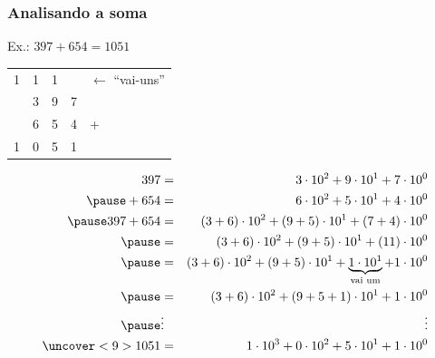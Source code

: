 \documentclass{beamer}
\begin{document}
\begin{frame}
\frametitle{Analisando a soma}

Ex.: $397 + 654 = 1051$\\[4pt]

\begin{center}
\begin{tabular}{c@{\,}c@{\,}c@{\,}cl}
 1 & 1 & 1 &   & $\leftarrow$ ``vai-uns''\\
   & 3 & 9 & 7 &   \\
   & 6 & 5 & 4 & + \\
\cline{1-4}
 1 & 0 & 5 & 1
\end{tabular}
\end{center}\vspace{-8pt}
\pause
\begin{eqnarray*}
397 & = & 3\cdot10^2 + 9\cdot10^1 + 7\cdot10^0\\
\pause
+ 654 & = & 6\cdot10^2 + 5\cdot10^1 + 4\cdot10^0\\
\pause
397 + 654 & = & (3+6)\cdot10^2 + (9+5)\cdot10^1 + (7+4)\cdot10^0 \\
\pause
          & = & (3+6)\cdot10^2 + (9+5)\cdot10^1 + (11)\cdot10^0 \\
\pause
          & = & (3+6)\cdot10^2 + (9+5)\cdot10^1 +
\underbrace{1\cdot10^1}_{\text{vai um}} + 1\cdot10^0 \\
\pause
          & = & (3+6)\cdot10^2 + (9+5+1)\cdot10^1 + 1\cdot10^0 \\
\pause
          & \vdots & \vdots \\
    \uncover<9>{1051}  & = & 1\cdot10^3 + 0\cdot10^2 + 5\cdot10^1 + 1\cdot10^0
\end{eqnarray*}

\end{frame}
\end{document}
